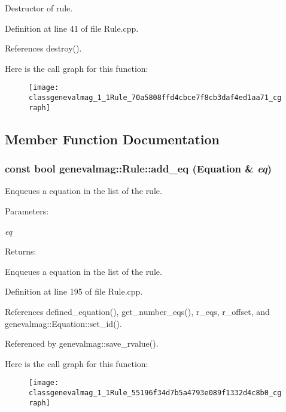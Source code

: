 Destructor of rule. 

Definition at line 41 of file Rule.cpp.

References destroy().

Here is the call graph for this function:\nopagebreak
\begin{figure}[H]
\begin{center}
\leavevmode
\texttt{[image: classgenevalmag\_1\_1Rule\_70a5808ffd4cbce7f8cb3daf4ed1aa71\_cgraph]}
\end{center}
\end{figure}


\subsection{Member Function Documentation}
\hypertarget{classgenevalmag_1_1Rule_55196f34d7b5a4793e089f1332d4c8b0}{
\subsubsection[{add\_\-eq}]{\setlength{\rightskip}{0pt plus 5cm}const bool genevalmag::Rule::add\_\-eq ({\bf Equation} \& {\em eq})}}
\label{classgenevalmag_1_1Rule_55196f34d7b5a4793e089f1332d4c8b0}


Enqueues a equation in the list of the rule. \begin{Desc}
\item[Parameters:]
\begin{description}
\item[{\em eq}]\end{description}
\end{Desc}
\begin{Desc}
\item[Returns:]\end{Desc}
Enqueues a equation in the list of the rule. 

Definition at line 195 of file Rule.cpp.

References defined\_\-equation(), get\_\-number\_\-eqs(), r\_\-eqs, r\_\-offset, and genevalmag::Equation::set\_\-id().

Referenced by genevalmag::save\_\-rvalue().

Here is the call graph for this function:\nopagebreak
\begin{figure}[H]
\begin{center}
\leavevmode
\texttt{[image: classgenevalmag\_1\_1Rule\_55196f34d7b5a4793e089f1332d4c8b0\_cgraph]}
\end{center}
\end{figure}


